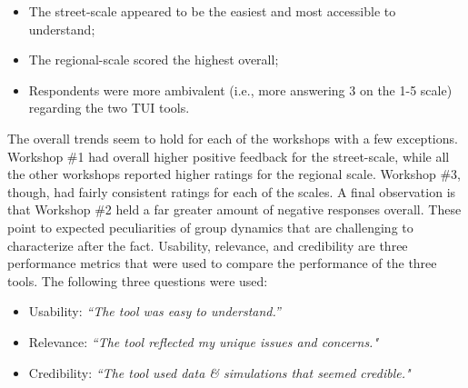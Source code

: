 {{{            \begin{itemize}
                \item The street-scale appeared to be the easiest and most accessible to understand;
                \item The regional-scale scored the highest overall;
                \item Respondents were more ambivalent (i.e., more answering 3 on the 1-5 scale) regarding the two TUI tools.
            \end{itemize}

            The overall trends seem to hold for each of the workshops with a few exceptions. Workshop \#1 had overall higher positive feedback for the street-scale, while all the other workshops reported higher ratings for the regional scale. Workshop \#3, though, had fairly consistent ratings for each of the scales. A final observation is that Workshop \#2 held a far greater amount of negative responses overall. These point to expected peculiarities of group dynamics that are challenging to characterize after the fact.
            \newline
            Usability, relevance, and credibility are three performance metrics that were used to compare the performance of the three tools. The following three questions were used:

            \begin{itemize}
                \item Usability: \textit{``The tool was easy to understand.''}
                \item Relevance: \textit{``The tool reflected my unique issues and concerns."}
                \item Credibility: \textit{``The tool used data \& simulations that seemed credible."}
            \end{itemize}

}}}
